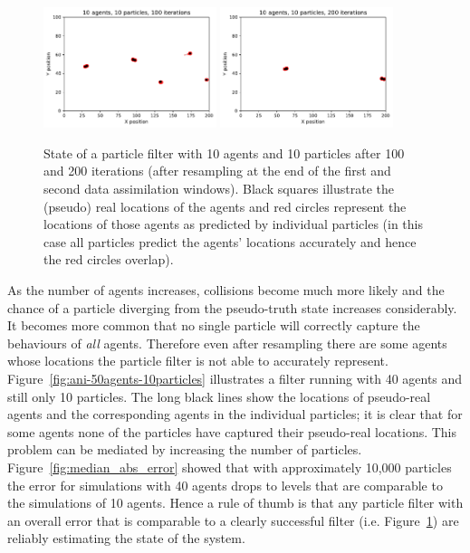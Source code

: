 \begin{figure}[ht]
	\centering
	\includegraphics[width=0.45\textwidth]{figures/results/ani-10agents-10particles-window100}
	\includegraphics[width=0.45\textwidth]{figures/results/ani-10agents-10particles-window200}
	\caption{State of a particle filter with 10 agents and 10 particles after 100 and 200 iterations (after resampling at the end of the first and second data assimilation windows). Black squares illustrate the (pseudo) real locations of the agents and red circles represent the locations of those agents as predicted by individual particles (in this case all particles predict the agents' locations accurately and hence the red circles overlap).} \label{fig:ani-10agents-10particles}
\end{figure}

As the number of agents increases, collisions become much more likely and the chance of a particle diverging from the pseudo-truth state increases considerably. It becomes more common that no single particle will correctly capture the behaviours of \textit{all} agents. Therefore even after resampling there are some agents whose locations the particle filter is not able to accurately represent. Figure~\ref{fig:ani-50agents-10particles} illustrates a filter running with 40 agents and still only 10 particles. The long black lines show the locations of pseudo-real agents and the corresponding agents in the individual particles; it is clear that for some agents none of the particles have captured their pseudo-real locations. This problem can be mediated by increasing the number of particles. Figure~\ref{fig:median_abs_error} showed that with approximately 10,000 particles the error for simulations with 40 agents drops to levels that are comparable to the simulations of 10 agents. Hence a rule of thumb is that any particle filter with an overall error that is comparable to a clearly successful filter (i.e. Figure~\ref{fig:ani-10agents-10particles}) are reliably estimating the state of the system.

